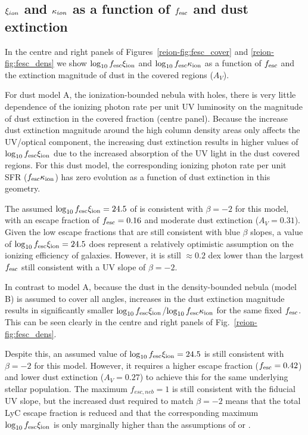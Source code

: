 \subsection{$\xi_{\lowercase{ion}}$ and $\kappa_{\lowercase{ion}}$ as a function of $f_{\rm{esc}}$ and dust extinction}
In the centre and right panels of Figures~\ref{reion-fig:fesc_cover} and \ref{reion-fig:fesc_dens} we show $\log_{10}f_{\rm{esc}}\xi_{\rm{ion}}$ and $\log_{10}f_{\rm{esc}}\kappa_{\rm{ion}}$ as a function of $f_{\rm{esc}}$ and the extinction magnitude of dust in the covered regions ($A_{V}$).

For dust model A, the ionization-bounded nebula with holes, there is very little dependence of the ionizing photon rate per unit UV luminosity on the magnitude of dust extinction in the covered fraction (centre panel). Because the increase dust extinction magnitude around the high column density areas only affects the UV/optical component, the increasing dust extinction results in higher values of $\log_{10}f_{\rm{esc}}\xi_{\rm{ion}}$ due to the increased absorption of the UV light in the dust covered regions. For this dust model, the corresponding ionizing photon rate per unit SFR ($f_{\rm{esc}}\kappa_{\rm{ion}}$) has zero evolution as a function of dust extinction in this geometry.

The assumed  $\log_{10}f_{\rm{esc}}\xi_{\rm{ion}} = 24.5$ of  is consistent with  $\beta  = -2$ for this model, with an escape fraction of $f_{\rm{esc}} = 0.16$ and moderate dust extinction ($A_{V} = 0.31$). Given the low escape fractions that are still consistent with blue $\beta$ slopes, a value of $\log_{10}f_{\rm{esc}}\xi_{\rm{ion}} = 24.5$ does represent a relatively optimistic assumption on the ionizing efficiency of galaxies. However, it is still $\approx 0.2$ dex lower than the largest $f_{\rm{esc}}$ still consistent with a UV slope of $\beta = -2$.

In contrast to model A, because the dust in the density-bounded nebula (model B) is assumed to cover all angles, increases in the dust extinction magnitude results in significantly smaller $\log_{10}f_{\rm{esc}}\xi_{\rm{ion}}$/$\log_{10}f_{\rm{esc}}\kappa_{\rm{ion}}$ for the same fixed $f_{\rm{esc}}$. This can be seen clearly in the centre and right panels of Fig.~\ref{reion-fig:fesc_dens}.

Despite this, an assumed value of $\log_{10}f_{\rm{esc}}\xi_{\rm{ion}} = 24.5$ is still consistent with $\beta = -2$ for this model. However, it requires a higher escape fraction ($f_{\rm{esc}} = 0.42$) and lower dust extinction ($A_{V} = 0.27$) to achieve this for the same underlying stellar population. The maximum $f_{esc,neb} = 1$ is still consistent with the fiducial UV slope, but the increased dust required to match $\beta = -2$ means that the total LyC escape fraction is reduced and that the corresponding maximum $\log_{10}f_{\rm{esc}}\xi_{\rm{ion}}$ is only marginally higher than the assumptions of \citep{Kuhlen:2012ka} or . 

